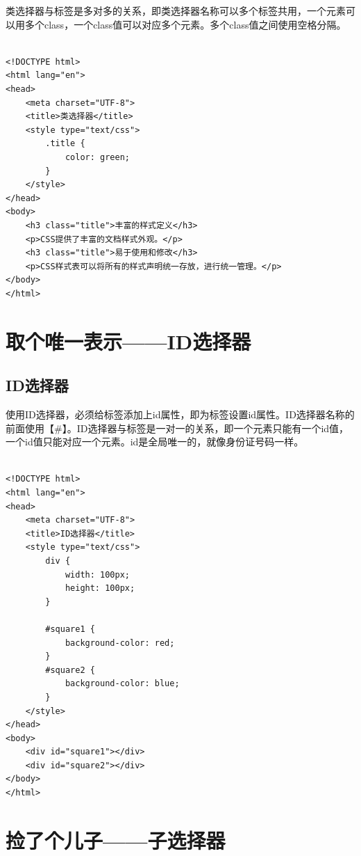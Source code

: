 类选择器与标签是多对多的关系，即类选择器名称可以多个标签共用，一个元素可以用多个class，一个class值可以对应多个元素。多个class值之间使用空格分隔。\\

\\

\begin{lstlisting}[style=htmlcssjs]
<!DOCTYPE html>
<html lang="en">
<head>
    <meta charset="UTF-8">
    <title>类选择器</title>
    <style type="text/css">
        .title {
            color: green;
        }
    </style>
</head>
<body>
    <h3 class="title">丰富的样式定义</h3>
    <p>CSS提供了丰富的文档样式外观。</p>
    <h3 class="title">易于使用和修改</h3>
    <p>CSS样式表可以将所有的样式声明统一存放，进行统一管理。</p>
</body>
</html>
\end{lstlisting}

\newpage

\section{取个唯一表示——ID选择器}

\subsection{ID选择器}

使用ID选择器，必须给标签添加上id属性，即为标签设置id属性。ID选择器名称的前面使用【\#】。ID选择器与标签是一对一的关系，即一个元素只能有一个id值，一个id值只能对应一个元素。id是全局唯一的，就像身份证号码一样。\\

\\

\begin{lstlisting}[style=htmlcssjs]
<!DOCTYPE html>
<html lang="en">
<head>
    <meta charset="UTF-8">
    <title>ID选择器</title>
    <style type="text/css">
        div {
            width: 100px;
            height: 100px;
        }

        #square1 {
            background-color: red;
        }
        #square2 {
            background-color: blue;
        }
    </style>
</head>
<body>
    <div id="square1"></div>
    <div id="square2"></div>
</body>
</html>
\end{lstlisting}

\newpage

\section{捡了个儿子——子选择器}

